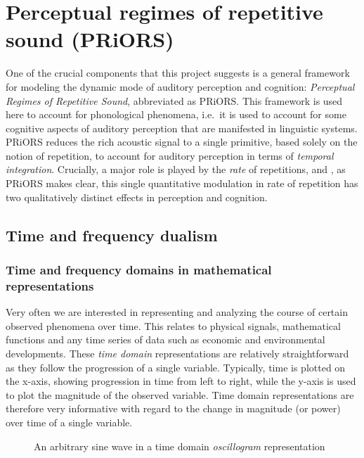 \chapter{Perceptual regimes of repetitive sound (PRiORS)}\label{sec:priors}

One of the crucial components that this project suggests is a general framework for modeling the dynamic mode of auditory perception and cognition: \emph{Perceptual Regimes of Repetitive Sound}, abbreviated as PRiORS. This framework is used here to account for phonological phenomena, i.e.~it is used to account for some cognitive aspects of auditory perception that are manifested in linguistic systems.
PRiORS reduces the rich acoustic signal to a single primitive, based solely on the notion of repetition, 
to account for auditory perception in terms of \emph{temporal integration}. Crucially, a major role is played by the \emph{rate} of repetitions, and , as PRiORS makes clear, this single quantitative modulation in rate of repetition has two qualitatively distinct effects in perception and cognition.

\section{Time and frequency dualism}\label{sec:dualism}

\subsection{Time and frequency domains in mathematical representations}\label{sec:dualismDomains}

Very often we are interested in representing and analyzing the course of certain observed phenomena over time. This relates to physical signals, mathematical functions and any time series of data such as economic and environmental developments.
These \emph{time domain} representations are relatively straightforward as they follow the progression of a single variable. Typically, time is plotted on the x-axis, showing progression in time from left to right, while the y-axis is used to plot the magnitude of the observed variable.
Time domain representations are therefore very informative with regard to the change in magnitude (or power) over time of a single variable.



\begin{figure}
\caption{An arbitrary sine wave in a time domain \emph{oscillogram} representation}\label{fig:sineTime}
\end{figure}

